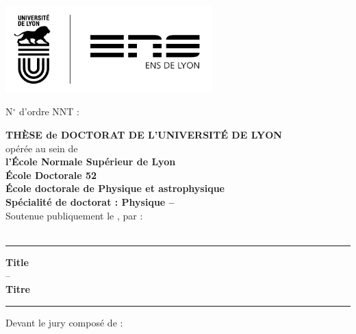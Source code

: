 
\begin{titlepage}


\begin{center}
        \includegraphics[width=8cm]{logos/logo-udl_ENS-LYON.pdf}
\end{center}
N$^{\circ}$ d'ordre NNT :  \\
\addtolength{\voffset}{4cm}

\centering

\large \textbf{TH\`ESE de DOCTORAT DE L'UNIVERSIT\'E DE LYON} \\

\normalsize
\vspace{.4cm}
opérée au sein de \\
\vspace{.4cm}
\textbf{l'\'Ecole Normale Supérieur de Lyon} \\
\vspace{.4cm}
\textbf{\'Ecole Doctorale 52} \\
\vspace{.1cm}
\textbf{\'Ecole doctorale de Physique et astrophysique} \\
\vspace{.6cm}
\textbf{Sp\'ecialit\'e de doctorat : Physique -- } \\
\vfill
Soutenue publiquement le , par :\\
\vspace{.2cm}
\Large\textbf{} \normalsize\\
\vfill
\hrule
\vspace{.3cm}
\LARGE\textbf{Title} \\
-- \\
\Large\textbf{Titre}\\

\vspace{.3cm}
\normalsize
\hrule
\vfill\justifying
\noindent Devant le jury composé de : \\
\vspace{.cm}


\end{titlepage}
